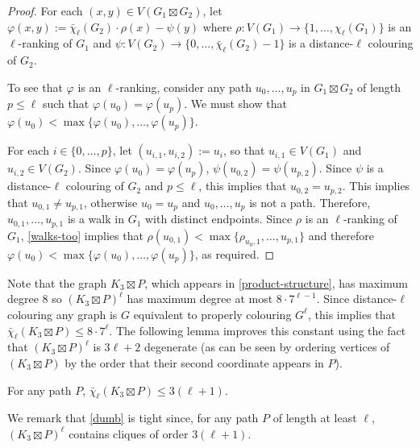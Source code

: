 \documentclass[kpfonts]{patmorin}
\newcommand{\lrn}{\chi_{\ell}}
\newcommand{\dlcn}{\bar{\chi}_\ell}
\theoremstyle{named}
\begin{document}
\begin{proof}
    For each $(x,y)\in V(G_1\boxtimes G_2)$, let $\varphi(x,y):=\dlcn(G_2)\cdot \rho(x) - \psi(y)$ where $\rho:V(G_1)\to\{1,\ldots,\lrn(G_1)\}$ is an $\ell$-ranking of $G_1$ and $\psi:V(G_2)\to\{0,\ldots,\dlcn(G_2)-1\}$ is a distance-$\ell$ colouring of $G_2$.

    To see that $\varphi$ is an $\ell$-ranking, consider any
    path $u_0,\ldots,u_p$ in $G_1\boxtimes G_2$ of length $p\le\ell$ such that $\varphi(u_0)=\varphi(u_p)$.  We must show that $\varphi(u_0)<\max\{\varphi(u_0),\ldots,\varphi(u_p)\}$.

    For each $i\in\{0,\ldots,p\}$, let $(u_{i,1},u_{i,2}):=u_i$, so that $u_{i,1}\in V(G_1)$ and $u_{i,2}\in V(G_2)$. Since $\varphi(u_0)=\varphi(u_p)$, $\psi(u_{0,2})=\psi(u_{p,2})$. Since $\psi$ is a distance-$\ell$ colouring of $G_2$ and $p\le\ell$, this implies that $u_{0,2}=u_{p,2}$.  This implies that $u_{0,1}\neq u_{p,1}$, otherwise $u_0=u_p$ and $u_0,\ldots,u_p$ is not a path.  Therefore, $u_{0,1},\ldots,u_{p,1}$ is a walk in $G_1$ with distinct endpoints.
    Since $\rho$ is an $\ell$-ranking of $G_1$, \cref{walks-too} implies that $\rho(u_{0,1})<\max\{\rho_{u_0,1},\ldots,u_{p,1}\}$ and therefore $\varphi(u_0)<\max\{\varphi(u_0),\ldots,\varphi(u_p)\}$, as required.
\end{proof}

Note that the graph $K_3\boxtimes P$, which appears in \cref{product-structure}, has maximum degree 8 so $(K_3\boxtimes P)^\ell$ has maximum degree at most $8\cdot 7^{\ell-1}$.  Since distance-$\ell$ colouring any graph is $G$ equivalent to properly colouring $G^{\ell}$, this implies that $\dlcn(K_3\boxtimes P)\le 8\cdot7^\ell$. The following lemma improves this constant using the fact that $(K_3\boxtimes P)^\ell$ is $3\ell+2$ degenerate (as can be seen by ordering vertices of $(K_3\boxtimes P)$ by the order that their second coordinate appears in $P$).

\begin{lem}\label{dumb}
    For any path $P$, $\dlcn(K_3\boxtimes P)\le 3(\ell+1)$.
\end{lem}

We remark that \cref{dumb} is tight since, for any path $P$ of length at least $\ell$, $(K_3\boxtimes P)^\ell$ contains cliques of order $3(\ell+1)$.

%
\end{document}
